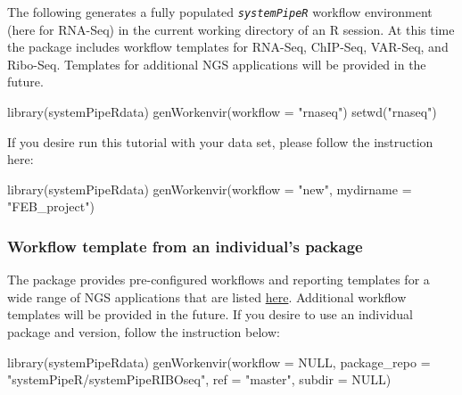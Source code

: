 \documentclass[14pt,]{article}
\newcommand{\hlstr}[1]{\textcolor[rgb]{0.251,0.627,0.251}{#1}}%
\newcommand{\hlstd}[1]{\textcolor[rgb]{0.251,0.251,0.251}{#1}}%
\newcommand{\hlkwc}[1]{\textcolor[rgb]{0.251,0.251,0.251}{#1}}%
\newcommand{\hlkwd}[1]{\textcolor[rgb]{0.878,0.439,0.125}{#1}}%
\newenvironment{Shaded}{\begin{myshaded}}{\end{myshaded}}
\newcommand{\KeywordTok}[1]{\hlkwd{#1}}
\newcommand{\DataTypeTok}[1]{\hlkwc{#1}}
\newcommand{\StringTok}[1]{\hlstr{#1}}
\newcommand{\OtherTok}[1]{{#1}}
\newcommand{\NormalTok}[1]{\hlstd{#1}}
\begin{document}
The following generates a fully populated \emph{\texttt{systemPipeR}} workflow environment
(here for RNA-Seq) in the current working directory of an R session. At this time
the package includes workflow templates for RNA-Seq, ChIP-Seq, VAR-Seq, and Ribo-Seq.
Templates for additional NGS applications will be provided in the future.

\begin{Shaded}
\begin{Highlighting}[]
\KeywordTok{library}\NormalTok{(systemPipeRdata)}
\KeywordTok{genWorkenvir}\NormalTok{(}\DataTypeTok{workflow =} \StringTok{"rnaseq"}\NormalTok{)}
\KeywordTok{setwd}\NormalTok{(}\StringTok{"rnaseq"}\NormalTok{)}
\end{Highlighting}
\end{Shaded}

If you desire run this tutorial with your data set, please follow the instruction here:

\begin{Shaded}
\begin{Highlighting}[]
\KeywordTok{library}\NormalTok{(systemPipeRdata)}
\KeywordTok{genWorkenvir}\NormalTok{(}\DataTypeTok{workflow =} \StringTok{"new"}\NormalTok{, }\DataTypeTok{mydirname =} \StringTok{"FEB_project"}\NormalTok{)}
\end{Highlighting}
\end{Shaded}

\hypertarget{workflow-template-from-an-individuals-package}{%
\subsubsection{Workflow template from an individual's package}\label{workflow-template-from-an-individuals-package}}

The package provides pre-configured workflows and reporting templates for a wide range of NGS applications that are listed \href{https://github.com/tgirke/systemPipeR/tree/devel\#workflow}{here}. Additional workflow templates will be provided in the future.
If you desire to use an individual package and version, follow the instruction below:

\begin{Shaded}
\begin{Highlighting}[]
\KeywordTok{library}\NormalTok{(systemPipeRdata)}
\KeywordTok{genWorkenvir}\NormalTok{(}\DataTypeTok{workflow =} \OtherTok{NULL}\NormalTok{, }\DataTypeTok{package_repo =} \StringTok{"systemPipeR/systemPipeRIBOseq"}\NormalTok{, }\DataTypeTok{ref =} \StringTok{"master"}\NormalTok{, }
    \DataTypeTok{subdir =} \OtherTok{NULL}\NormalTok{)}
\end{Highlighting}
\end{Shaded}
\end{document}
